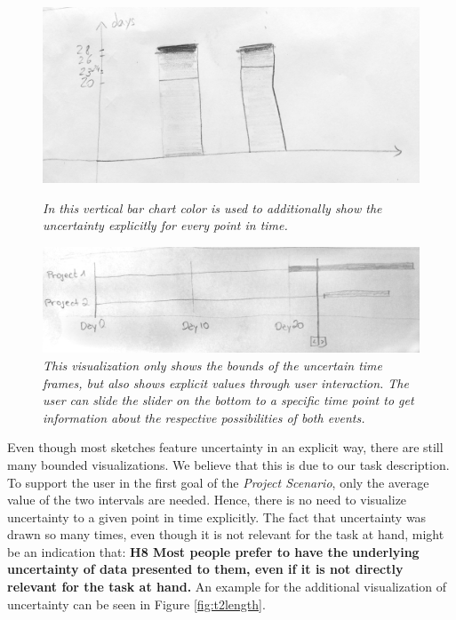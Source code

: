 \begin{figure}[H]
	\begin{minipage}{.5\textwidth}
		\centering
		\captionsetup{width=0.8\textwidth}
		\includegraphics[height=0.4\textwidth]{figures/t2color.jpg}
		\caption{\textit{In this vertical bar chart color is used to additionally show the uncertainty explicitly for every point in time.}}
		\label{fig:t2color}
	\end{minipage}
	\begin{minipage}{.5\textwidth}
		\centering
		\captionsetup{width=1.0\textwidth}
		\includegraphics[height=0.3\textwidth]{figures/t2interaction.jpg}
		\caption{\textit{This visualization only shows the bounds of the uncertain time frames, but also shows explicit values through user interaction. The user can slide the slider on the bottom to a specific time point to get information about the respective possibilities of both events.}}
		\label{fig:t2interaction}
	\end{minipage}
\end{figure}


Even though most sketches feature uncertainty in an explicit way, there are still many bounded visualizations. We believe that this is due to our task description. To support the user in the first goal of the \textit{Project Scenario}, only the average value of the two intervals are needed. Hence, there is no need to visualize uncertainty to a given point in time explicitly. The fact that uncertainty was drawn so many times, even though it is not relevant for the task at hand, might be an indication that: \textbf{H8 Most people prefer to have the underlying uncertainty of data presented to them, even if it is not directly relevant for the task at hand.} An example for the additional visualization of uncertainty can be seen in Figure \ref{fig:t2length}.  \par \medskip

